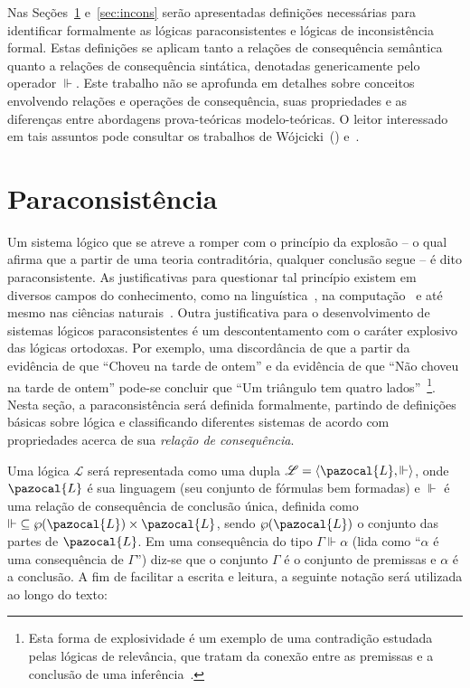 Nas Seções~\ref{sec:paracons} e~\ref{sec:incons} serão apresentadas definições necessárias para identificar formalmente as lógicas paraconsistentes e lógicas de inconsistência formal. Estas definições se aplicam tanto a relações de consequência semântica quanto a relações de consequência sintática, denotadas genericamente pelo operador $\Vdash$. Este trabalho não se aprofunda em detalhes sobre conceitos envolvendo relações e operações de consequência, suas propriedades e as diferenças entre abordagens prova-teóricas modelo-teóricas. O leitor interessado em tais assuntos pode consultar os trabalhos de Wójcicki~(\citeyear{Wojcicki1984-WJCLOP,Wojcicki1988-WOJAAT,Wojcicki1988-WOJTOL}) e~.

\section{Paraconsistência}\label{sec:paracons}
    Um sistema lógico que se atreve a romper com o princípio da explosão {--} o qual afirma que a partir de uma teoria contraditória, qualquer conclusão segue {--} é dito paraconsistente. As justificativas para questionar tal princípio existem em diversos campos do conhecimento, como na linguística~\cite{McGinnis2013-MCGTUA}, na computação~\cite{carnielli2000formal} e até mesmo nas ciências naturais~\cite{Brown2015-BROCAP-9}. Outra justificativa para o desenvolvimento de sistemas lógicos paraconsistentes é um descontentamento com o caráter explosivo das lógicas ortodoxas. Por exemplo, uma discordância de que a partir da evidência de que ``Choveu na tarde de ontem'' e da evidência de que ``Não choveu na tarde de ontem'' pode-se concluir que ``Um triângulo tem quatro lados''~\footnote{Esta forma de explosividade é um exemplo de uma contradição estudada pelas lógicas de relevância, que tratam da conexão entre as premissas e a conclusão de uma inferência~\cite{sep-logic-relevance}.}. Nesta seção, a paraconsistência será definida formalmente, partindo de definições básicas sobre lógica e classificando diferentes sistemas de acordo com propriedades acerca de sua \textit{relação de consequência}.

    Uma lógica $\mathcal{L}$ será representada como uma dupla $\mathcal{L} = \langle \pazocal{L},\Vdash \rangle$, onde $\pazocal{L}$ é sua linguagem (seu conjunto de fórmulas bem formadas) e $\Vdash$ é uma relação de consequência de conclusão única, definida como $\Vdash \;\subseteq \wp(\pazocal{L})\times\pazocal{L}$, sendo $\wp(\pazocal{L})$ o conjunto das partes de $\pazocal{L}$. Em uma consequência do tipo $\Gamma \Vdash \alpha$ (lida como ``$\alpha$ é uma consequência de $\Gamma$'') diz-se que o conjunto $\Gamma$ é o conjunto de premissas e $\alpha$ é a conclusão. A fim de facilitar a escrita e leitura, a seguinte notação será utilizada ao longo do texto:

